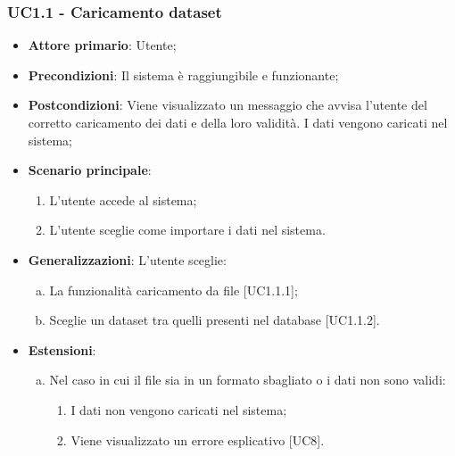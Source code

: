\subsubsection{UC1.1 - Caricamento dataset}

\begin{itemize}
	\item \textbf{Attore primario}: Utente;
	\item \textbf{Precondizioni}: Il sistema è raggiungibile e funzionante;
	\item \textbf{Postcondizioni}: Viene visualizzato un messaggio che avvisa l'utente del corretto caricamento dei dati e della loro validità. I dati vengono caricati nel sistema;
	\item \textbf{Scenario principale}:
		\begin{enumerate}
			\item L'utente accede al sistema;
			\item L'utente sceglie come importare i dati nel sistema.
			
		\end{enumerate}
		
	\item \textbf{Generalizzazioni}: L'utente sceglie:
	\begin{enumerate}[(a)]
			\item La funzionalità caricamento da file [UC1.1.1];
			\item Sceglie un dataset tra quelli presenti nel database [UC1.1.2].
			\end{enumerate}
	
	\item \textbf{Estensioni}:
	\begin{enumerate}[(a)]
		\item Nel caso in cui il file sia in un formato sbagliato o i dati non sono validi:
		\begin{enumerate}[1.]
			\item I dati non vengono caricati nel sistema;
			\item Viene visualizzato un errore esplicativo [UC8].
		\end{enumerate}
	\end{enumerate}
\end{itemize}

